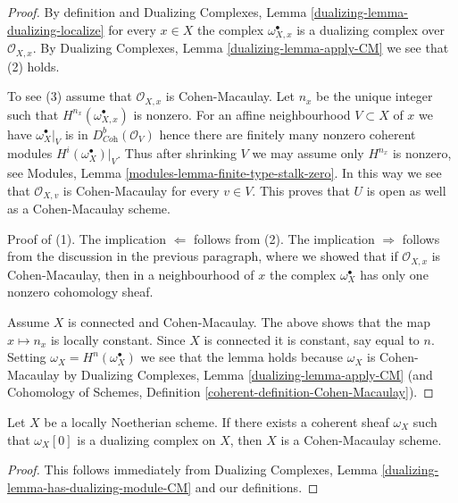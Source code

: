 \begin{proof}
By definition and Dualizing Complexes, Lemma
\ref{dualizing-lemma-dualizing-localize} for every $x \in X$
the complex $\omega_{X, x}^\bullet$ is a dualizing complex over
$\mathcal{O}_{X, x}$. By
Dualizing Complexes, Lemma \ref{dualizing-lemma-apply-CM}
we see that (2) holds.

\medskip\noindent
To see (3) assume that $\mathcal{O}_{X, x}$ is Cohen-Macaulay.
Let $n_x$ be the unique integer such that
$H^{n_{x}}(\omega_{X, x}^\bullet)$ is nonzero.
For an affine neighbourhood $V \subset X$
of $x$ we have $\omega_X^\bullet|_V$ is in $D^b_{\textit{Coh}}(\mathcal{O}_V)$
hence there are finitely many nonzero coherent modules
$H^i(\omega_X^\bullet)|_V$. Thus after shrinking $V$ we may assume
only $H^{n_x}$ is nonzero, see
Modules, Lemma \ref{modules-lemma-finite-type-stalk-zero}.
In this way we see that $\mathcal{O}_{X, v}$ is Cohen-Macaulay
for every $v \in V$. This proves that $U$ is open as well
as a Cohen-Macaulay scheme.

\medskip\noindent
Proof of (1). The implication $\Leftarrow$ follows from (2).
The implication $\Rightarrow$ follows from the discussion
in the previous paragraph, where we showed that if $\mathcal{O}_{X, x}$
is Cohen-Macaulay, then in a neighbourhood of $x$ the complex
$\omega_X^\bullet$ has only one nonzero cohomology sheaf.

\medskip\noindent
Assume $X$ is connected and Cohen-Macaulay. The above shows that
the map $x \mapsto n_x$ is locally constant.
Since $X$ is connected it is constant, say equal to $n$.
Setting $\omega_X = H^n(\omega_X^\bullet)$ we see that the lemma
holds because $\omega_X$ is Cohen-Macaulay by
Dualizing Complexes, Lemma \ref{dualizing-lemma-apply-CM}
(and Cohomology of Schemes, Definition
\ref{coherent-definition-Cohen-Macaulay}).
\end{proof}

\begin{lemma}
\label{lemma-has-dualizing-module-CM-scheme}
Let $X$ be a locally Noetherian scheme. If there exists a coherent sheaf
$\omega_X$ such that $\omega_X[0]$ is a dualizing complex on $X$, then
$X$ is a Cohen-Macaulay scheme.
\end{lemma}

\begin{proof}
This follows immediately from
Dualizing Complexes, Lemma \ref{dualizing-lemma-has-dualizing-module-CM}
and our definitions.
\end{proof}

